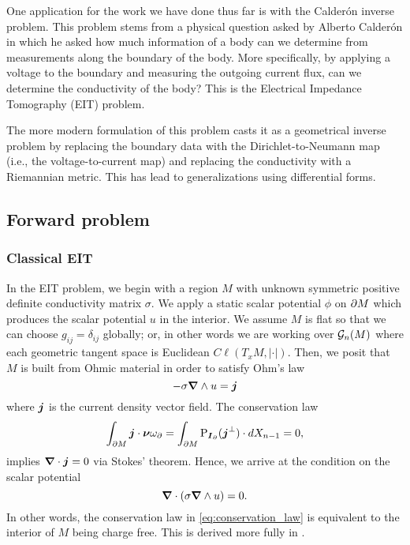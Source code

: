 One application for the work we have done thus far is with the Calder\'on inverse problem. This problem stems from a physical question asked by Alberto Calder\'on in which he asked how much information of a body can we determine from measurements along the boundary of the body. More specifically, by applying a voltage to the boundary and measuring the outgoing current flux, can we determine the conductivity of the body? This is the Electrical Impedance Tomography (EIT) problem.

The more modern formulation of this problem casts it as a geometrical inverse problem by replacing the boundary data with the Dirichlet-to-Neumann map (i.e., the voltage-to-current map) and replacing the conductivity with a Riemannian metric. This has lead to generalizations using differential forms. 


\subsection{Forward problem}

\subsubsection{Classical EIT}
In the EIT problem, we begin with a region $M$ with unknown symmetric positive definite conductivity matrix $\sigma$. We apply a static scalar potential $\phi$ on ${\partial M}$ which produces the scalar potential $u$ in the interior. We assume $M$ is flat so that we can choose $g_{ij}=\delta_{ij}$ globally; or, in other words we are working over $\mathcal{G}_n(M)$ where each geometric tangent space is Euclidean $C\ell(T_xM, |\cdot|)$. Then, we posit that $M$ is built from Ohmic material in order to satisfy Ohm's law 
\begin{equation}
\label{eq:ohms_law}
-\sigma \boldsymbol{\nabla} \wedge u= \boldsymbol{j}
\end{equation}
where $\boldsymbol{j}$ is the current density vector field. The conservation law
\begin{equation}
\label{eq:conservation_law}
\int_{{\partial M}} \boldsymbol{j} \cdot \boldsymbol{\nu} \omega_\partial = \int_{{\partial M}} \operatorname{P}_{\boldsymbol{I}_\partial}(\boldsymbol{j}^\perp) \cdot dX_{n-1} = 0,
\end{equation}
implies $\boldsymbol{\nabla} \cdot \boldsymbol{j}= 0$ via Stokes' theorem. Hence, we arrive at the condition on the scalar potential
\begin{equation}
\boldsymbol{\nabla} \cdot (\sigma \boldsymbol{\nabla} \wedge u) = 0.
\end{equation} 
In other words, the conservation law in \cref{eq:conservation_law} is equivalent to the interior of $M$ being charge free. This is derived more fully in \cite{feldman_calderproblem_nodate}. 

